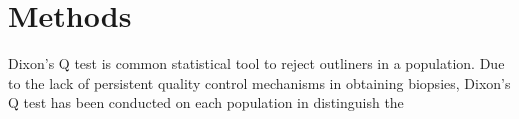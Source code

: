 \chapter{Methods}

Dixon's Q test is common statistical tool to reject outliners in a population. Due to the lack of persistent quality control mechanisms in obtaining biopsies, Dixon's Q test has been conducted on each population in distinguish the 